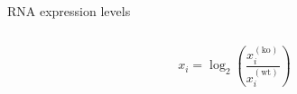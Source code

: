 \begin{frame}{RNA expression levels}
\begin{columns}
\begin{column}{0.3\textwidth}
\begin{equation}
\label{eq:logFC}
    x_i = \log_2 \left( \frac{x_i^{(\text{ko})}}{x_i^{(\text{wt})}} \right)
\end{equation}
\end{column}


\end{columns}
\end{frame}
